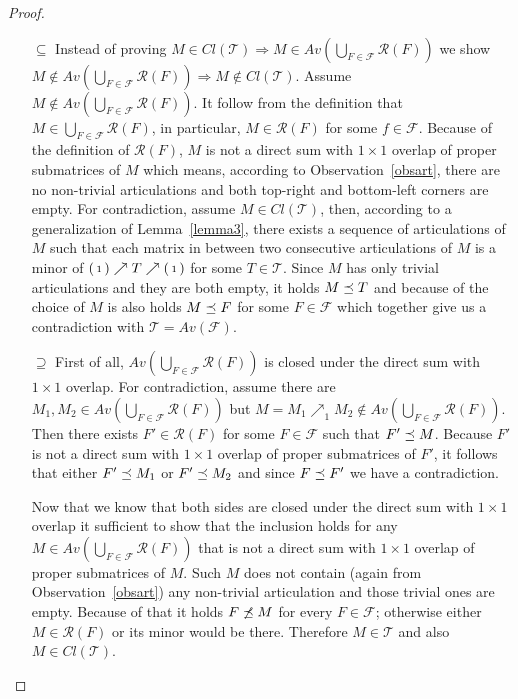 \begin{proof}
\begin{itemize}
\item[$\subseteq$] Instead of proving $M\in Cl(\mathcal{T})\Rightarrow M\in Av(\bigcup_{F\in\mathcal{F}}\mathcal{R}(F))$ we show $M\not\in Av(\bigcup_{F\in\mathcal{F}}\mathcal{R}(F))\Rightarrow M\not\in Cl(\mathcal{T})$. Assume $M\not\in Av(\bigcup_{F\in\mathcal{F}}\mathcal{R}(F))$. It follow from the definition that $M\in\bigcup_{F\in\mathcal{F}}\mathcal{R}(F)$, in particular, $M\in\mathcal{R}(F)$ for some $f\in\mathcal{F}$. Because of the definition of $\mathcal{R}(F)$, $M$ is not a direct sum with $1\times1$ overlap of proper submatrices of $M$ which means, according to Observation~\ref{obsart}, there are no non-trivial articulations and both top-right and bottom-left corners are empty. For contradiction, assume $M\in Cl(\mathcal{T})$, then, according to a generalization of Lemma~\ref{lemma3}, there exists a sequence of articulations of $M$ such that each matrix in between two consecutive articulations of $M$ is a minor of $\left(\begin{smallmatrix}1\end{smallmatrix}\right)\nearrow T\nearrow\left(\begin{smallmatrix}1\end{smallmatrix}\right)$ for some $T\in\mathcal{T}$. Since $M$ has only trivial articulations and they are both empty, it holds $M\preceq T$ and because of the choice of $M$ is also holds $M\preceq F$ for some $F\in\mathcal{F}$ which together give us a contradiction with $\mathcal{T}=Av(\mathcal{F})$.
\item[$\supseteq$] First of all, $Av(\bigcup_{F\in\mathcal{F}}\mathcal{R}(F))$ is closed under the direct sum with $1\times1$ overlap. For contradiction, assume there are $M_1,M_2\in Av(\bigcup_{F\in\mathcal{F}}\mathcal{R}(F))$ but $M=M_1\nearrow_{1}M_2\not\in Av(\bigcup_{F\in\mathcal{F}}\mathcal{R}(F))$. Then there exists $F'\in\mathcal{R}(F)$ for some $F\in\mathcal{F}$ such that $F'\preceq M$. Because $F'$ is not a direct sum with $1\times1$ overlap of proper submatrices of $F'$, it follows that either $F'\preceq M_1$ or $F'\preceq M_2$ and since $F\preceq F'$ we have a contradiction.

Now that we know that both sides are closed under the direct sum with $1\times1$ overlap it sufficient to show that the inclusion holds for any $M\in Av(\bigcup_{F\in\mathcal{F}}\mathcal{R}(F))$ that is not a direct sum with $1\times1$ overlap of proper submatrices of $M$. Such $M$ does not contain (again from Observation~\ref{obsart}) any non-trivial articulation and those trivial ones are empty. Because of that it holds $F\not\preceq M$ for every $F\in\mathcal{F}$; otherwise either $M\in\mathcal{R}(F)$ or its minor would be there. Therefore $M\in\mathcal{T}$ and also $M\in Cl(\mathcal{T})$.
\end{itemize}
\end{proof}